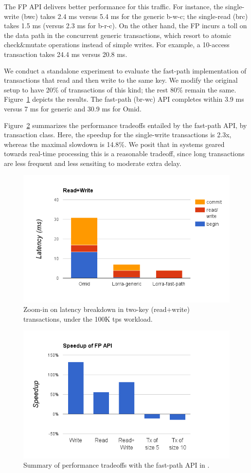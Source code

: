 The FP API delivers better performance for this traffic. For instance, the single-write ({\code bwc}) takes 2.4 ms versus 
5.4 ms for the generic {\code b-w-c}; the single-read ({\code brc}) takes 1.5 ms (versus 2.3 ms for {\code b-r-c}). On the other hand, 
the FP incurs  a toll on the data path in the concurrent generic transactions, which resort to atomic check\&mutate operations 
instead of simple writes. For example, a 10-access transaction takes 24.4 ms versus 20.8 ms. 

We conduct a standalone experiment to evaluate the fast-path implementation of transactions that read and then write 
to the same key. We modify the original setup to have 20\% of transactions of this kind; the rest 80\% remain the same.
Figure~\ref{fig:rmw} depicts the results. The fast-path ({\code br-wc}) API completes within 3.9 ms versus 7 ms for generic {\sys\/} 
and 30.9 ms for Omid. 

Figure~\ref{fig:fp-tradeoff} summarizes the performance tradeoffs entailed by the fast-path API, by transaction class. 
Here, the speedup for the single-write transactions is 2.3x, whereas the maximal slowdown is 14.8\%. We posit that 
in systems geared towards real-time processing this is a reasonable tradeoff, since long transactions are less frequent
and less sensiting to moderate extra delay. 

\begin{figure}[t]
\includegraphics[width=.5\textwidth]{figs/stack-br-wc.png}
\caption{Zoom-in on latency breakdown in two-key (read+write) transactions, 
under the 100K tps workload.}
\label{fig:rmw}
\end{figure}

\begin{figure}[h]
\includegraphics[width=.5\textwidth]{figs/speedup.png}
\caption{Summary of performance tradeoffs with the fast-path API in {\sys}.}
\label{fig:fp-tradeoff}
\end{figure}

